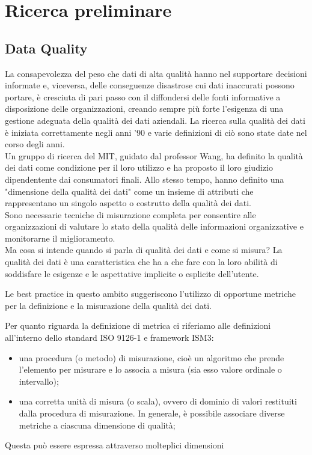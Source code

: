 \documentclass[a4paper,12pt]{article}
\begin{document}
\tableofcontents

\newpage

\section{Ricerca preliminare} 

\subsection{Data Quality}

La consapevolezza del peso che dati di alta qualità hanno nel supportare decisioni informate e, viceversa, delle conseguenze disastrose cui dati inaccurati possono portare, è cresciuta di pari passo con il diffondersi delle fonti informative a disposizione delle organizzazioni, creando sempre più forte l’esigenza di una gestione adeguata della qualità dei dati aziendali. La ricerca sulla qualità dei dati è iniziata correttamente negli anni '90 e varie definizioni di ciò sono state date nel corso degli anni. \\

\noindent Un gruppo di ricerca del MIT, guidato dal professor Wang, ha definito la qualità dei dati come condizione per il loro utilizzo e ha proposto il loro giudizio dipendentente dai consumatori finali. Allo stesso tempo, hanno definito una "dimensione della qualità dei dati" come un insieme di attributi che rappresentano un singolo aspetto o costrutto della qualità dei dati. \\

\noindent Sono necessarie tecniche di misurazione completa per consentire alle organizzazioni di valutare lo stato della qualità delle informazioni organizzative e monitorarne il miglioramento. \\

\noindent Ma cosa si intende quando si parla di qualità dei dati e come si misura? 
La qualità dei dati è una caratteristica che ha a che fare con la loro abilità di soddisfare le esigenze e le aspettative implicite o esplicite dell'utente. 

\noindent Le best practice in questo ambito suggeriscono l’utilizzo di opportune metriche per la definizione e la misurazione della qualità dei dati. 

\noindent Per quanto riguarda la definizione di metrica ci riferiamo alle definizioni all'interno dello standard ISO 9126-1 e framework ISM3:
\begin{itemize}
	\item una procedura (o metodo) di misurazione, cioè un algoritmo che prende l'elemento per misurare e lo associa a misura (sia esso valore ordinale o intervallo); 
	\item una corretta unità di misura (o scala), ovvero di dominio di valori restituiti dalla procedura di misurazione. In generale, è possibile associare diverse metriche a ciascuna dimensione di qualità;
\end{itemize} 
Questa può essere espressa attraverso molteplici dimensioni
\end{document}
